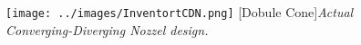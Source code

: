 \begin{figure}[H]
\centering
\texttt{[image: ../images/InventortCDN.png]}
[Dobule Cone]{\textit{Actual Converging-Diverging Nozzel design.}}
\label{fig:InventortCDN}
\end{figure}
